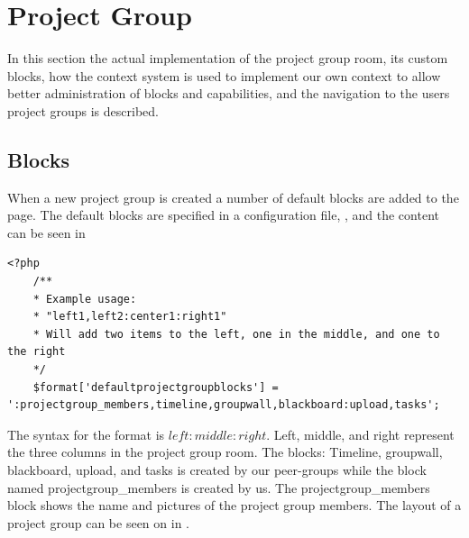 \section{Project Group \viewroom[c]}
\label{sec:projGroupRoomImpl}
In this section the actual implementation of the project group room, its custom blocks, how the context system is used to implement our own context to allow better administration of blocks and capabilities, and the navigation to the users project groups is described. %





\subsection{Blocks}
\label{sec:implprojectgroupblocks}
When a new project group is created a number of default blocks are added to the page. 
The default blocks are specified in a configuration file, , and the content can be seen in 


\begin{lstlisting}[style=phpCode, caption=\myCaption{The default block configuration}, label=moodledaultblock]
<?php
	/**
	* Example usage:
	* "left1,left2:center1:right1"
	* Will add two items to the left, one in the middle, and one to the right
	*/
	$format['defaultprojectgroupblocks'] = ':projectgroup_members,timeline,groupwall,blackboard:upload,tasks';
\end{lstlisting}
The syntax for the format is $left:middle:right$. 
Left, middle, and right represent the three columns in the project group room. 
The blocks: Timeline, groupwall, blackboard, upload, and tasks is created by our peer-groups while the block named projectgroup\_members is created by us. 
The projectgroup\_members block shows the name and pictures of the project group members. 
The layout of a project group \viewroom[] can be seen on  in .

	





